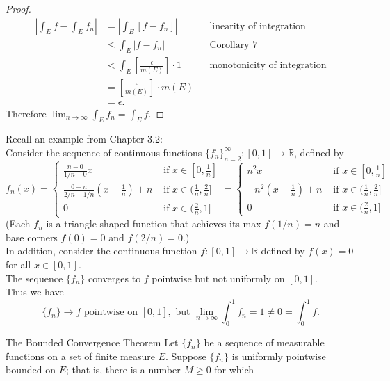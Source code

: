 \begin{flushleft}
\begin{proof}
        \begin{align*}
            |\int_Ef-\int_Ef_n|&=|\int_E[f-f_n]|&&\text{linearity of integration}\\
            &\le\int_E|f-f_n|&&\text{Corollary 7}\\
            &<\int_E[\frac{\epsilon}{m(E)}]\cdot1&&\text{monotonicity of integration}\\
            &=[\frac{\epsilon}{m(E)}]\cdot m(E)\\
            &=\epsilon.
        \end{align*}
        Therefore $\lim_{n\to\infty}\int_Ef_n=\int_Ef$.
    \end{proof}
    Recall an example from Chapter 3.2:
        \\Consider the sequence of continuous functions $\{f_n\}_{n=2}^\infty:[0,1]\to\mathbb{R}$, defined by
        \[ 
		f_n(x) =
            \begin{cases} 
                \frac{n-0}{1/n-0}x& \text{ if } x \in [0,\frac{1}{n}]\\
                \frac{0-n}{2/n-1/n}(x-\frac{1}{n})+n & \text{ if } x \in (\frac{1}{n},\frac{2}{n}]\\
                0& \text{ if } x \in (\frac{2}{n},1]
            \end{cases}
            =
            \begin{cases} 
                n^2x& \text{ if } x \in [0,\frac{1}{n}]\\
                -n^2(x-\frac{1}{n})+n & \text{ if } x \in (\frac{1}{n},\frac{2}{n}]\\
                0& \text{ if } x \in (\frac{2}{n},1]
            \end{cases}
	    \]
        (Each $f_n$ is a triangle-shaped function that achieves its max $f(1/n)=n$ and base corners $f(0)=0$ and $f(2/n)=0$.)\\
        In addition, consider the continuous function $f:[0,1]\to\mathbb{R}$ defined by $f(x)=0$ for all $x\in[0,1]$.\\\bigskip
        The sequence $\{f_n\}$ converges to $f$ pointwise but not uniformly on $[0,1]$.
        \\Thus we have
        \[
            \{f_n\}\to f\text{ pointwise on }[0,1],\text{ but }\lim_{n\to\infty}\int_0^1f_n=1\neq0=\int_0^1f.
        \]
    \begin{namedthm*}{The Bounded Convergence Theorem}
        Let $\{f_n\}$ be a sequence of measurable functions on a set of finite measure $E$.
        Suppose $\{f_n\}$ is uniformly pointwise bounded on $E$; that is, there is a number $M\ge0$ for which

\end{namedthm*}
\end{flushleft}
